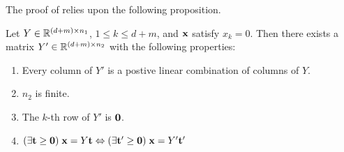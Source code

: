 The proof of  relies upon the following proposition.
\begin{Prop}\label{fm_vcone}
	Let $Y \in \mathbb{R}^{(d+m)\times n_1}$, $1 \leq k \leq d+m$, and $\mathbf{x}$ satisfy $x_k = 0$.  Then there exists a matrix $Y' \in \mathbb{R}^{(d+m)\times n_2}$ with the following properties:
	\begin{enumerate}
		\item Every column of $Y'$ is a postive linear combination of columns of $Y$.
		\item $n_2$ is finite.
		\item The $k$-th row of $Y'$ is $\mathbf{0}$.
		\item \((\exists \mathbf{t}\geq\mathbf{0})\;\mathbf{x} = Y\mathbf{t} \Leftrightarrow (\exists \mathbf{t}' \geq \mathbf{0})\;\mathbf{x} = Y'\mathbf{t}'\)
	\end{enumerate}
\end{Prop}

